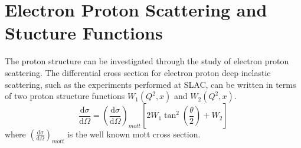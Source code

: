 \documentclass[abstract = on,listof=totoc, bibliography=totoc]{scrreprt}
\begin{document}
\section{Electron Proton Scattering and Stucture Functions}

The proton structure can be investigated through the study of electron proton scattering. The differential cross section for electron proton deep inelastic scattering, such as the experiments performed at SLAC, can be written in terms of two proton structure functions $W_1(Q^2, x)$ and $W_2(Q^2, x)$.
\begin{equation}
\frac{\text{d}\sigma}{\text{d}\Omega} = \left(\frac{\text{d}\sigma}{\text{d}\Omega}\right)_{mott}\left[2W_1\tan^2\left(\frac{\theta}{2}\right) + W_2\right]
\end{equation}
where $\left(\frac{\text{d}\sigma}{\text{d}\Omega}\right)_{mott}$ is the well known mott cross section.
\end{document}
